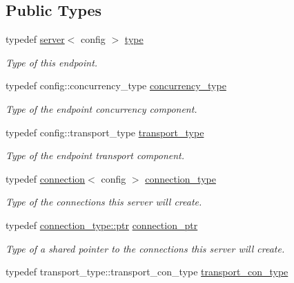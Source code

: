 \subsection*{Public Types}
\begin{DoxyCompactItemize}
\item 
typedef \hyperlink{classwebsocketpp_1_1server}{server}$<$ config $>$ \hyperlink{classwebsocketpp_1_1server_a265fd3d99141089206f0053c6b842790}{type}
\begin{DoxyCompactList}\small\item\em Type of this endpoint. \end{DoxyCompactList}\item 
typedef config\+::concurrency\+\_\+type \hyperlink{classwebsocketpp_1_1server_ad389e3f96682b13a16f2bf01568eeabd}{concurrency\+\_\+type}
\begin{DoxyCompactList}\small\item\em Type of the endpoint concurrency component. \end{DoxyCompactList}\item 
typedef config\+::transport\+\_\+type \hyperlink{classwebsocketpp_1_1server_a762a51efebd0c0f87918f0369434f04f}{transport\+\_\+type}
\begin{DoxyCompactList}\small\item\em Type of the endpoint transport component. \end{DoxyCompactList}\item 
typedef \hyperlink{classwebsocketpp_1_1connection}{connection}$<$ config $>$ \hyperlink{classwebsocketpp_1_1server_a82d3d94b70a49b2073c9b3378ec7047c}{connection\+\_\+type}
\begin{DoxyCompactList}\small\item\em Type of the connections this server will create. \end{DoxyCompactList}\item 
typedef \hyperlink{classwebsocketpp_1_1connection_ab910d42e3bde91546183cc54642f32ab}{connection\+\_\+type\+::ptr} \hyperlink{classwebsocketpp_1_1server_a0b93f09ceae3d1dafd2f7b1da759c2ad}{connection\+\_\+ptr}
\begin{DoxyCompactList}\small\item\em Type of a shared pointer to the connections this server will create. \end{DoxyCompactList}\item 
typedef transport\+\_\+type\+::transport\+\_\+con\+\_\+type \hyperlink{classwebsocketpp_1_1server_a0515060720d024fb5d0ee7db1b4498a6}{transport\+\_\+con\+\_\+type}

\end{DoxyCompactItemize}
